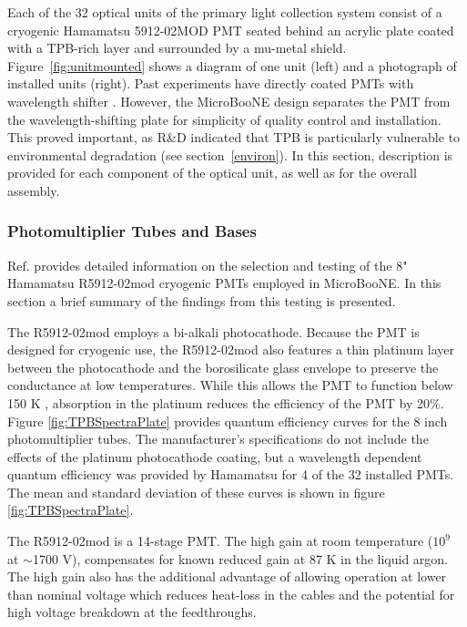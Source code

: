 Each of the 32 optical units of the primary light collection system consist of a cryogenic Hamamatsu 5912-02MOD PMT seated behind an acrylic plate coated with a TPB-rich layer and surrounded by a mu-metal shield. 
Figure~\ref{fig:unitmounted} shows a diagram of one unit (left) and a photograph of installed units (right).  Past experiments have directly coated PMTs with wavelength shifter \cite{Icarus}.  However, 
the MicroBooNE design separates the PMT from the wavelength-shifting plate for simplicity of quality control and installation.  This proved important, as R\&D indicated that TPB is particularly vulnerable to environmental degradation (see section~\ref{environ}).  In this section, description is provided for each component of the optical unit, as well as for the overall assembly.


\subsubsection{Photomultiplier Tubes and Bases}

Ref. \cite{Briese:2013wua} provides detailed information on the selection 
and testing of the 8" Hamamatsu R5912-02mod cryogenic PMTs employed in MicroBooNE.   
In this section a brief summary of the findings from this testing is presented.

The R5912-02mod employs a bi-alkali photocathode.  Because the PMT is designed for cryogenic use, the R5912-02mod also features a thin platinum layer between the photocathode and the borosilicate glass envelope to preserve the conductance at low temperatures.   While this allows the PMT to function below 150 K \cite{HOMeyer}, absorption in the platinum reduces the efficiency of the PMT by 20\%.
Figure \ref{fig:TPBSpectraPlate} provides quantum efficiency curves for the 8 inch photomultiplier tubes. The manufacturer's specifications do not include the effects of the platinum photocathode coating, but a wavelength dependent quantum efficiency was provided by Hamamatsu for 4 of the 32 installed PMTs.  The mean and standard deviation of these curves is shown in figure \ref{fig:TPBSpectraPlate}. 

The  R5912-02mod is a 14-stage PMT.
The high gain at room temperature ($10^9$ at $\sim$1700 V), compensates for known reduced gain at 87 K in the liquid argon.  
The high gain also has the additional advantage of allowing operation at lower than nominal voltage which reduces heat-loss in the cables and the potential for high voltage breakdown at the feedthroughs.



